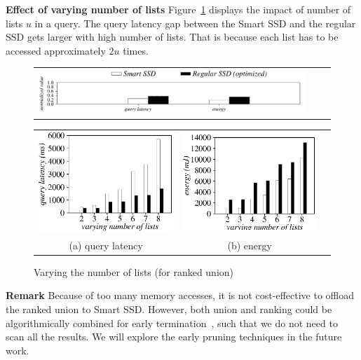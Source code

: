 \textbf{Effect of varying number of lists}
Figure~\ref{fig:varyNumKeywordsRankUnion} displays the impact of number of lists $u$ in a query. The query latency gap between the Smart SSD and the regular SSD gets larger with high number of lists. That is because each list has to be accessed approximately $2u$ times.
  \begin{figure}[htbp]
  \centering
    \begin{tabular}{ccc}
 \includegraphics[width=0.52\columnwidth]{figures/banner2.pdf}
\end{tabular}
\vspace{-0.1cm}
\renewcommand{\tabcolsep}{0.1mm}
  \begin{tabular}{ccc}
 \includegraphics[width=0.5\columnwidth]{figures/RankUnion-time-VaryNumLists.eps}&
  \includegraphics[width=0.5\columnwidth]{figures/RankUnion-energy-VaryNumLists.eps}\\
  (a) query latency & (b) energy
\end{tabular}
  \caption{Varying the number of lists (for ranked union)}
  \label{fig:varyNumKeywordsRankUnion}
 \end{figure}

\textbf{Remark}
Because of too many memory accesses, it is not cost-effective to offload the ranked union to Smart SSD.
However, both union and ranking could be algorithmically combined for early termination~\cite{Broder2003EQE,Fagin2001}, such that we do not need to scan all the results. We will explore the early pruning techniques in the future work.

